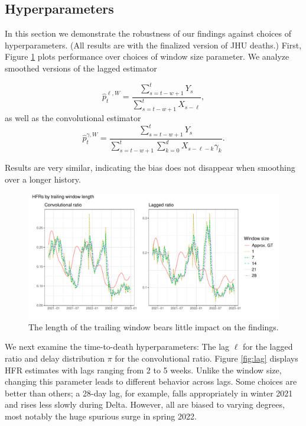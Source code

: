 \documentclass{article}
\renewcommand{\hat}{\widehat} %
\begin{document}
\subsection{Hyperparameters}
In this section we demonstrate the robustness of our findings against choices of hyperparameters. (All results are with the finalized version of JHU deaths.) First, Figure \ref{fig:window} plots performance over choices of window size parameter. We analyze smoothed versions of the lagged estimator

\begin{equation}\label{eq:laggedSmooth}
    \hat{p}_t^{\ell, W} = \frac{\sum_{s=t-w+1}^{t} Y_s}{\sum_{s=t-w+1}^{t} X_{s-\ell}},
\end{equation}
\noindent as well as the convolutional estimator
\begin{equation}\label{eq:convSmooth}
    \hat{p}_t^{\gamma, W} = \frac{\sum_{s=t-w+1}^{t} Y_s}{\sum_{s=t-w+1}^{t} \sum_{k=0}^d X_{s-\ell-k}\gamma_k}.
\end{equation}

\noindent Results are very similar, indicating the bias does not disappear when smoothing over a longer history. 

\begin{figure}
    \centering
    \includegraphics[width=0.75\linewidth]{Figures/Real/window_size.pdf}
    \caption{The length of the trailing window bears little impact on the findings.}
    \label{fig:window}
\end{figure}

We next examine the time-to-death hyperparameters: The lag $\ell$ for the lagged ratio and delay distribution $\pi$ for the convolutional ratio. Figure \ref{fig:lag} displays HFR estimates with lags ranging from 2 to 5 weeks. Unlike the window size, changing this parameter leads to different behavior across lags. Some choices are better than others; a 28-day lag, for example, falls appropriately in winter 2021 and rises less slowly during Delta. However, all are biased to varying degrees, most notably the huge spurious surge in spring 2022.
\end{document}
